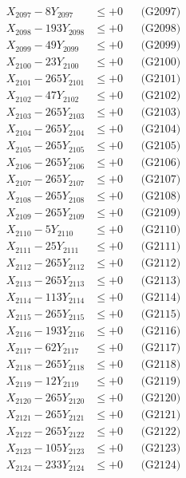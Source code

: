 \documentclass[a4paper,10pt]{article}
\begin{document}
{\begin{align}
X_{2097} - 8Y_{2097} &\leq +0 && \text{(G2097)} \\
X_{2098} - 193Y_{2098} &\leq +0 && \text{(G2098)} \\
X_{2099} - 49Y_{2099} &\leq +0 && \text{(G2099)} \\
X_{2100} - 23Y_{2100} &\leq +0 && \text{(G2100)} \\
\allowbreak
X_{2101} - 265Y_{2101} &\leq +0 && \text{(G2101)} \\
X_{2102} - 47Y_{2102} &\leq +0 && \text{(G2102)} \\
X_{2103} - 265Y_{2103} &\leq +0 && \text{(G2103)} \\
X_{2104} - 265Y_{2104} &\leq +0 && \text{(G2104)} \\
X_{2105} - 265Y_{2105} &\leq +0 && \text{(G2105)} \\
X_{2106} - 265Y_{2106} &\leq +0 && \text{(G2106)} \\
X_{2107} - 265Y_{2107} &\leq +0 && \text{(G2107)} \\
X_{2108} - 265Y_{2108} &\leq +0 && \text{(G2108)} \\
X_{2109} - 265Y_{2109} &\leq +0 && \text{(G2109)} \\
X_{2110} - 5Y_{2110} &\leq +0 && \text{(G2110)} \\
\allowbreak
X_{2111} - 25Y_{2111} &\leq +0 && \text{(G2111)} \\
X_{2112} - 265Y_{2112} &\leq +0 && \text{(G2112)} \\
X_{2113} - 265Y_{2113} &\leq +0 && \text{(G2113)} \\
X_{2114} - 113Y_{2114} &\leq +0 && \text{(G2114)} \\
X_{2115} - 265Y_{2115} &\leq +0 && \text{(G2115)} \\
X_{2116} - 193Y_{2116} &\leq +0 && \text{(G2116)} \\
X_{2117} - 62Y_{2117} &\leq +0 && \text{(G2117)} \\
X_{2118} - 265Y_{2118} &\leq +0 && \text{(G2118)} \\
X_{2119} - 12Y_{2119} &\leq +0 && \text{(G2119)} \\
X_{2120} - 265Y_{2120} &\leq +0 && \text{(G2120)} \\
\allowbreak
X_{2121} - 265Y_{2121} &\leq +0 && \text{(G2121)} \\
X_{2122} - 265Y_{2122} &\leq +0 && \text{(G2122)} \\
X_{2123} - 105Y_{2123} &\leq +0 && \text{(G2123)} \\
X_{2124} - 233Y_{2124} &\leq +0 && \text{(G2124)} \\

\end{align}}
\end{document}
